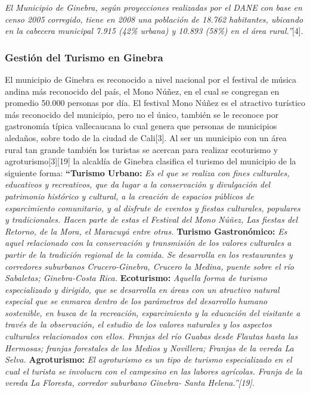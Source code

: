 \documentclass[12pt,letterpaper,openany]{book}
\begin{document}
\textit{El Municipio de Ginebra, según proyecciones realizadas por el DANE con base en censo 2005 corregido, tiene en 2008 una población de 18.762 habitantes, ubicando en la cabecera municipal 7.915 (42\% urbana) y 10.893 (58\%) en el área rural.”}[4].

\subsubsection{Gestión del Turismo en Ginebra}
El municipio de Ginebra es reconocido a nivel nacional por el festival de música andina más reconocido del país, el Mono Núñez, en el cual se congregan en promedio 50.000 personas por día. El festival Mono Núñez es el atractivo turístico más reconocido del municipio, pero no el único, también se le reconoce por gastronomía típica vallecaucana lo cual genera que personas de municipios aledaños, sobre todo de la ciudad de Cali[3]. Al ser un municipio con un área rural tan grande también los turistas se acercan para realizar ecoturismo y agroturismo[3][19] la alcaldía de Ginebra clasifica el turismo del municipio de la siguiente forma:
\vspace{5mm}\newline
\textbf{“Turismo Urbano:} \textit{Es el que se realiza con fines culturales, educativos y recreativos, que da lugar a la conservación y divulgación del patrimonio histórico y cultural, a la creación de espacios públicos de esparcimiento comunitario, y al disfrute de eventos y fiestas culturales, populares y tradicionales. Hacen parte de estas el Festival del Mono Núñez, Las fiestas del Retorno, de la Mora, el Maracuyá entre otras.}
\vspace{5mm}\newline
\textbf{Turismo Gastronómico:} \textit{Es aquel relacionado con la conservación y transmisión de los valores culturales a partir de la tradición regional de la comida. Se desarrolla en los restaurantes y corredores suburbanos Crucero-Ginebra, Crucero la Medina, puente sobre el río Sabaletas; Ginebra-Costa Rica.}
\vspace{5mm}\newline
\textbf{Ecoturismo:} \textit{Aquella forma de turismo especializado y dirigido, que se desarrolla en áreas con un atractivo natural especial que se enmarca dentro de los parámetros del desarrollo humano sostenible, en busca de la recreación, esparcimiento y la educación del visitante a través de la observación, el estudio de los valores naturales y los aspectos culturales relacionados con ellos. Franjas del río Guabas desde Flautas hasta las Hermosas; franjas forestales de los Medios y Novillera; Franjas de la vereda La Selva.}
\vspace{5mm}\newline
\textbf{Agroturismo:} \textit{El agroturismo es un tipo de turismo especializado en el cual el turista se involucra con el campesino en las labores agrícolas. Franja de la vereda La Floresta, corredor suburbano Ginebra- Santa Helena.”[19].}
\end{document}
